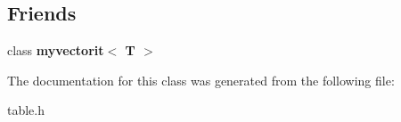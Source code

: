 \subsection*{Friends}
\begin{DoxyCompactItemize}
\item 
\hypertarget{classmvector_a53177cff3c481d260832b9be5d61d619}{}class {\bfseries myvectorit$<$ T $>$}\label{classmvector_a53177cff3c481d260832b9be5d61d619}

\end{DoxyCompactItemize}


The documentation for this class was generated from the following file\+:\begin{DoxyCompactItemize}
\item 
table.\+h\end{DoxyCompactItemize}
